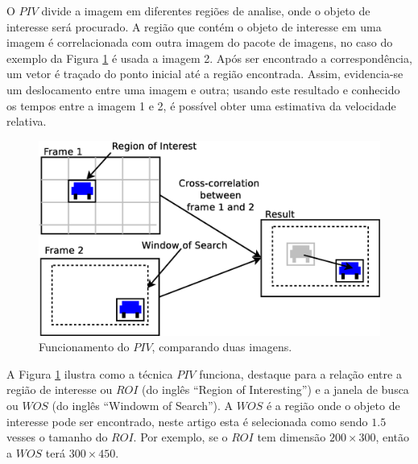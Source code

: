 O $PIV$ divide a imagem em diferentes regiões de analise, onde o objeto de interesse será procurado. 
A região que contém o objeto de interesse em uma imagem é correlacionada 
com outra imagem do pacote de imagens, no caso do exemplo da Figura \ref{fig:twoframes} é usada a imagem 2. 
Após ser encontrado a correspondência, um vetor é traçado do ponto inicial
até a região encontrada. Assim, evidencia-se um deslocamento entre uma imagem e outra; usando este resultado
e conhecido os tempos entre a imagem 1 e 2,
é possível obter uma  estimativa da velocidade relativa.

\begin{figure}[H]
\includegraphics[width=\columnwidth]{images/explanationPIV.eps}
\caption{Funcionamento do $PIV$, comparando duas imagens.}
\label{fig:twoframes}
\end{figure}

A Figura \ref{fig:twoframes} ilustra como a técnica $PIV$ funciona, 
destaque para a relação entre a região de interesse ou $ROI$ (do inglês ``Region of Interesting'') e 
a janela de busca ou $WOS$  (do inglês ``Windowm of Search''). 
A $WOS$ é a região onde o objeto de interesse pode ser encontrado,
neste artigo esta é selecionada como sendo $1.5$ vesses o tamanho do $ROI$. 
Por exemplo, se o $ROI$ tem dimensão $200\times300$, então a $WOS$ terá $300\times450$.


